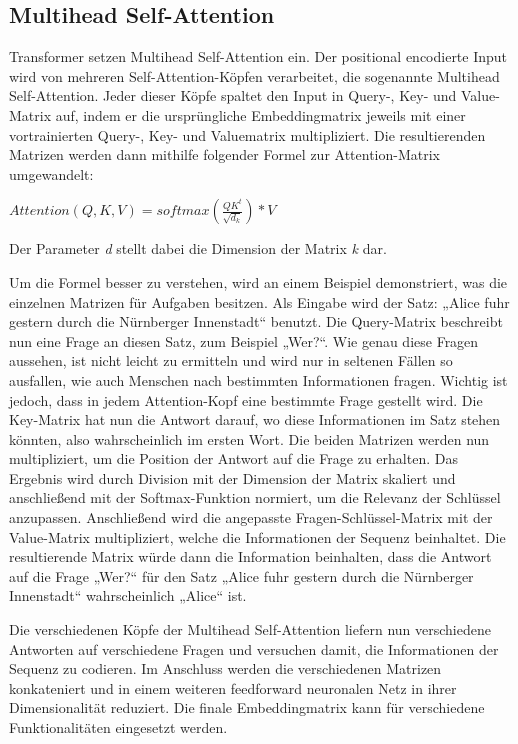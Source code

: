 \subsection{Multihead Self-Attention}

Transformer setzen Multihead Self-Attention ein.
Der positional encodierte Input wird von mehreren Self-Attention-Köpfen verarbeitet, die sogenannte Multihead Self-Attention.
Jeder dieser Köpfe spaltet den Input in Query-, Key- und Value-Matrix auf, indem er die ursprüngliche Embeddingmatrix jeweils mit einer vortrainierten Query-, Key- und Valuematrix multipliziert.
Die resultierenden Matrizen werden dann mithilfe folgender Formel zur Attention-Matrix umgewandelt:

$Attention(Q,K,V)=softmax(\frac{QK^t}{\sqrt{d_k}})*V$

Der Parameter \textit{d} stellt dabei die Dimension der Matrix \textit{k} dar.

Um die Formel besser zu verstehen, wird an einem Beispiel demonstriert, was die einzelnen Matrizen für Aufgaben besitzen.
Als Eingabe wird der Satz: „Alice fuhr gestern durch die Nürnberger Innenstadt“ benutzt.
Die Query-Matrix beschreibt nun eine Frage an diesen Satz, zum Beispiel „Wer?“.
Wie genau diese Fragen aussehen, ist nicht leicht zu ermitteln und wird nur in seltenen Fällen so ausfallen, wie auch Menschen nach bestimmten Informationen fragen.
Wichtig ist jedoch, dass in jedem Attention-Kopf eine bestimmte Frage gestellt wird.
Die Key-Matrix hat nun die Antwort darauf, wo diese Informationen im Satz stehen könnten, also wahrscheinlich im ersten Wort.
Die beiden Matrizen werden nun multipliziert, um die Position der Antwort auf die Frage zu erhalten.
Das Ergebnis wird durch Division mit der Dimension der Matrix skaliert und anschließend mit der Softmax-Funktion normiert, um die Relevanz der Schlüssel anzupassen.
Anschließend wird die angepasste Fragen-Schlüssel-Matrix mit der Value-Matrix multipliziert, welche die Informationen der Sequenz beinhaltet.
Die resultierende Matrix würde dann die Information beinhalten, dass die Antwort auf die Frage „Wer?“ für den Satz „Alice fuhr gestern durch die Nürnberger Innenstadt“ wahrscheinlich „Alice“ ist.

Die verschiedenen Köpfe der Multihead Self-Attention liefern nun verschiedene Antworten auf verschiedene Fragen und versuchen damit, die Informationen der Sequenz zu codieren.
Im Anschluss werden die verschiedenen Matrizen konkateniert und in einem weiteren feedforward neuronalen Netz in ihrer Dimensionalität reduziert.
Die finale Embeddingmatrix kann für verschiedene Funktionalitäten eingesetzt werden.

